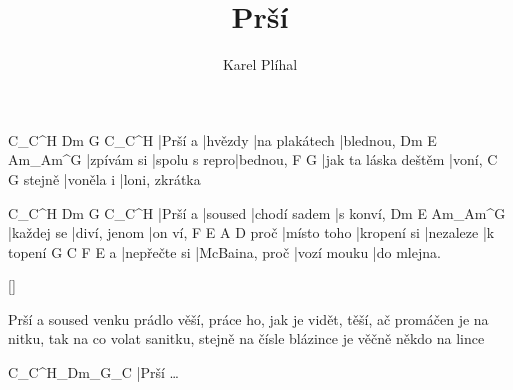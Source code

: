 \documentclass{song}
\title{Prší}
\author{Karel Plíhal}
\begin{document}
C_C^H  Dm      G             C_C^H
|Prší a |hvězdy |na plakátech |blednou,
Dm         E             Am_Am^G
|zpívám si |spolu s repro|bednou,
F                    G
|jak ta láska deštěm |voní,
       C         G
stejně |voněla i |loni, zkrátka
\endstrophe

\strophe
C_C^H Dm       G            C_C^H
|Prší a |soused |chodí sadem |s konví,
Dm         E            Am_Am^G
|každej se |diví, jenom |on ví,
     F           E           A         D
proč |místo toho |kropení si |nezaleze |k topení
  G            C              F           E
a |nepřečte si |McBaina, proč |vozí mouku |do mlejna.
\endstrophe

\ref{}

\strophe*
Prší a soused venku prádlo věší,
práce ho, jak je vidět, těší,
ač promáčen je na nitku, tak na co volat sanitku,
stejně na čísle blázince je věčně někdo na lince
\endstrophe

\strophe
C_C^H_Dm_G_C
|Prší \ldots
\endstrophe
\end{document}
